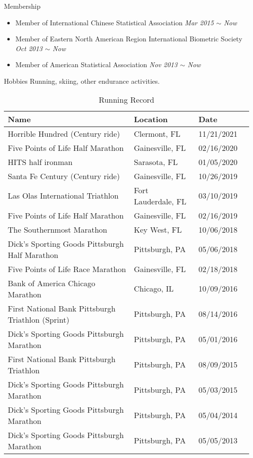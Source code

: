 \documentclass{resume} %
\begin{document}
\begin{rSection}{Membership}
\begin{itemize}[noitemsep,topsep=0pt]
\item Member of International Chinese Statistical Association
        \hfill {\em Mar 2015 $\sim$ Now} 
\item Member of Eastern North American Region International Biometric Society
        \hfill {\em Oct 2013 $\sim$ Now} 
\item Member of American Statistical Association
        \hfill {\em Nov 2013 $\sim$ Now} 
\end{itemize}
\end{rSection}


\begin{rSection}{Hobbies}
Running, skiing, other endurance activities.

\begin{table}[htp]
\caption*{Running Record}
\begin{center}
\begin{tabular}{l l l l}
\hline
\hline
Name & Location  & Date \\
\hline
Horrible Hundred (Century ride) & Clermont, FL &  {11/21/2021} \\
Five Points of Life Half Marathon & Gainesville, FL &  {02/16/2020} \\
HITS half ironman & Sarasota, FL & 01/05/2020 \\
Santa Fe Century (Century ride)  & Gainesville, FL & 10/26/2019 \\
Las Olas International Triathlon & Fort Lauderdale, FL &  {03/10/2019} \\
Five Points of Life Half Marathon & Gainesville, FL &  {02/16/2019} \\
The Southernmost Marathon & Key West, FL &  {10/06/2018}\\
Dick's Sporting Goods Pittsburgh Half Marathon & Pittsburgh, PA &  {05/06/2018}\\
Five Points of Life Race Marathon & Gainesville, FL&   {02/18/2018}\\
Bank of America Chicago Marathon & Chicago, IL&   {10/09/2016}\\
First National Bank Pittsburgh Triathlon (Sprint) & Pittsburgh, PA &   {08/14/2016}\\
Dick's Sporting Goods Pittsburgh Marathon & Pittsburgh, PA&   {05/01/2016} \\
First National Bank Pittsburgh Triathlon & Pittsburgh, PA &  {08/09/2015}\\
Dick's Sporting Goods Pittsburgh Marathon & {Pittsburgh, PA} &  {05/03/2015}\\
Dick's Sporting Goods Pittsburgh Marathon & {Pittsburgh, PA} &    {{05/04/2014}}\\
Dick's Sporting Goods Pittsburgh Marathon & {Pittsburgh, PA} &   {05/05/2013}\\
\hline
\hline
\end{tabular}
\end{center}
\label{default}
\end{table}%


\end{rSection}
\end{document}
